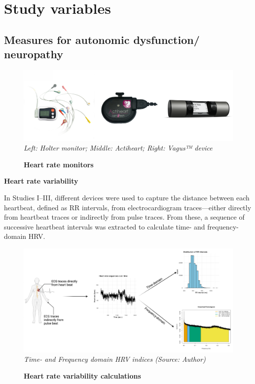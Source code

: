 \documentclass[
  a4paper,
  headsepline=true,
  open=left]{scrbook}
\begin{document}
\hypertarget{study-variables}{%
\section{Study variables}\label{study-variables}}

\hypertarget{measures-for-autonomic-dysfunction-neuropathy}{%
\subsection{Measures for autonomic dysfunction/
neuropathy}\label{measures-for-autonomic-dysfunction-neuropathy}}

\begin{figure}

{\centering 

\includegraphics{images/can_tools.pdf} \emph{Left: Holter monitor;
Middle: Actiheart; Right: Vagus™ device}

}

\caption{\label{fig-monitor}\textbf{Heart rate monitors}}

\end{figure}

\textbf{Heart rate variability}

In Studies I--III, different devices were used to capture the distance
between each heartbeat, defined as RR intervals, from electrocardiogram
traces---either directly from heartbeat traces or indirectly from pulse
traces. From these, a sequence of successive heartbeat intervals was
extracted to calculate time- and frequency-domain HRV.

\begin{figure}

{\centering 

\includegraphics{images/measurements_hrv.pdf} \emph{Time- and Frequency
domain HRV indices (Source: Author)}

}

\caption{\label{fig-hrv}\textbf{Heart rate variability calculations}}

\end{figure}
\end{document}
